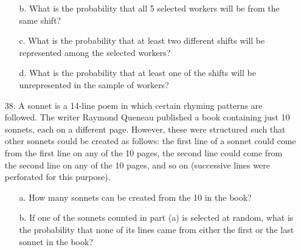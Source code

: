 \documentclass[letterpaper,12pt]{article}
\begin{document}
\begin{enumerate}
\begin{enumerate}
      \item[b.]
        What is the probability that all 5 selected workers will be from the same shift?
      \item[c.]
        What is the probability that at least two different shifts will be represented among the selected workers?
      \item[d.]
        What is the probability that at least one of the shifts will be unrepresented in the sample of workers?
    \end{enumerate}
  \item[38.]
    A sonnet is a 14-line poem in which certain rhyming patterns are followed. The writer Raymond Queneau published a book containing just 10 sonnets, each on a different page. However, these were structured such that other sonnets could be created as follows: the first line of a sonnet could come from the first line on any of the 10 pages, the second line could come from the second line on any of the 10 pages, and so on (successive lines were perforated for this purpose).
    \begin{enumerate}
        \item[a.]
          How many sonnets can be created from the 10 in the book?
        \item[b.]
          If one of the sonnets counted in part (a) is selected at random, what is the probability that none of its lines came from either the first or the last sonnet in the book?
      \end{enumerate}
\end{enumerate}
\end{document}
